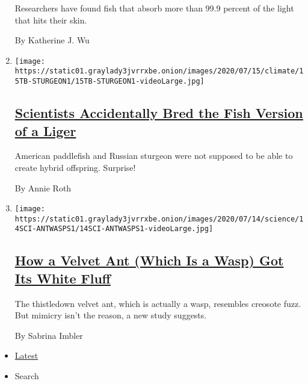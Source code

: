 \begin{enumerate}
  Researchers have found fish that absorb more than 99.9 percent of the
  light that hits their skin.

  By Katherine J. Wu
\item
  \texttt{[image: https://static01.graylady3jvrrxbe.onion/images/2020/07/15/climate/15TB-STURGEON1/15TB-STURGEON1-videoLarge.jpg]}

  \hypertarget{scientists-accidentally-bred-the-fish-version-of-a-liger}{%
  \subsection{\texorpdfstring{\href{/2020/07/15/science/hybrid-sturgeon-paddlefish.html}{Scientists
  Accidentally Bred the Fish Version of a
  Liger}}{Scientists Accidentally Bred the Fish Version of a Liger}}\label{scientists-accidentally-bred-the-fish-version-of-a-liger}}

  American paddlefish and Russian sturgeon were not supposed to be able
  to create hybrid offspring. Surprise!

  By Annie Roth
\item
  \texttt{[image: https://static01.graylady3jvrrxbe.onion/images/2020/07/14/science/14SCI-ANTWASPS1/14SCI-ANTWASPS1-videoLarge.jpg]}

  \hypertarget{how-a-velvet-ant-which-is-a-wasp-got-its-white-fluff}{%
  \subsection{\texorpdfstring{\href{/2020/07/14/science/white-fluffy-ant-wasp.html}{How
  a Velvet Ant (Which Is a Wasp) Got Its White
  Fluff}}{How a Velvet Ant (Which Is a Wasp) Got Its White Fluff}}\label{how-a-velvet-ant-which-is-a-wasp-got-its-white-fluff}}

  The thistledown velvet ant, which is actually a wasp, resembles
  creosote fuzz. But mimicry isn't the reason, a new study suggests.

  By Sabrina Imbler
\end{enumerate}

\begin{itemize}
\tightlist
\item
  \protect\hyperlink{stream-panel}{Latest}
\item
  Search
\end{itemize}

